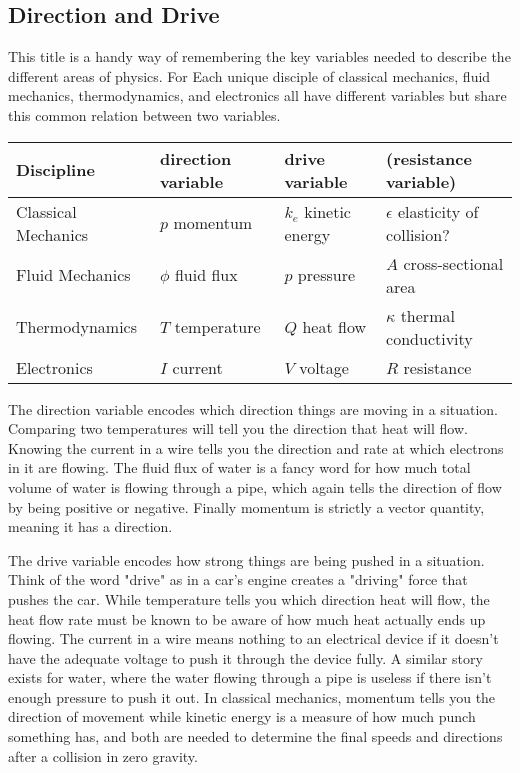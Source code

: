 \documentclass[a4paper]{article}
\begin{document}
\subsection{Direction and Drive}

This title is a handy way of remembering the key variables needed to describe the different areas of physics. For Each unique disciple of classical mechanics, fluid mechanics, thermodynamics, and electronics all have different variables but share this common relation between two variables. 

\vspace{0.2cm} \hspace{0.2cm}
\begin{tabular}{| l | l | l | l |}
\toprule
Discipline & direction variable & drive variable & (resistance variable) \\
\midrule
Classical Mechanics & $p$ momentum & $k_e$ kinetic energy & $\epsilon$ elasticity of collision? \\
Fluid Mechanics & $\phi$ fluid flux & $p$ pressure & $A$ cross-sectional area\\
Thermodynamics & $T$ temperature & $Q$ heat flow & $\kappa$ thermal conductivity \\
Electronics & $I$ current & $V$ voltage & $R$ resistance \\
\bottomrule
\end{tabular}
\vspace{0.2cm}

The direction variable encodes which direction things are moving in a situation. Comparing two temperatures will tell you the direction that heat will flow. Knowing the current in a wire tells you the direction and rate at which electrons in it are flowing. The fluid flux of water is a fancy word for how much total volume of water is flowing through a pipe, which again tells the direction of flow by being positive or negative. Finally momentum is strictly a vector quantity, meaning it has a direction.

The drive variable encodes how strong things are being pushed in a situation. Think of the word "drive" as in a car's engine creates a "driving" force that pushes the car. While temperature tells you which direction heat will flow, the heat flow rate must be known to be aware of how much heat actually ends up flowing. The current in a wire means nothing to an electrical device if it doesn't have the adequate voltage to push it through the device fully. A similar story exists for water, where the water flowing through a pipe is useless if there isn't enough pressure to push it out. In classical mechanics, momentum tells you the direction of movement while kinetic energy is a measure of how much punch something has, and both are needed to determine the final speeds and directions after a collision in zero gravity. 
\end{document}
